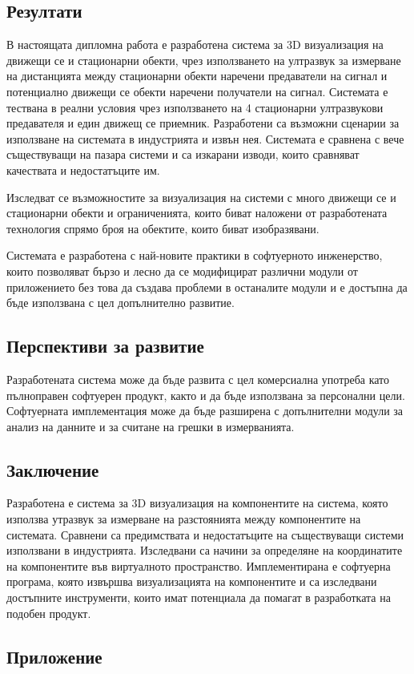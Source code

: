\subsection{Резултати}

В настоящата дипломна работа е разработена система за 3D визуализация на движещи се и стационарни обекти, чрез използването на ултразвук за измерване на дистанцията между стационарни обекти наречени предаватели на сигнал и потенциално движещи се обекти наречени получатели на сигнал. Системата е тествана в реални условия чрез използването на 4 стационарни ултразвукови предавателя и един движещ се приемник. Разработени са възможни сценарии за използване на системата в индустрията и извън нея. Системата е сравнена с вече съществуващи на пазара системи и са изкарани изводи, които сравняват качествата и недостатъците им.

Изследват се възможностите за визуализация на системи с много движещи се и стационарни обекти и ограниченията, които биват наложени от разработената технология спрямо броя на обектите, които биват изобразявани.

Системата е разработена с най-новите практики в софтуерното инженерство, които позволяват бързо и лесно да се модифицират различни модули от приложението без това да създава проблеми в останалите модули и е достъпна да бъде използвана с цел допълнително развитие.

\subsection{Перспективи за развитие}
Разработената система може да бъде развита с цел комерсиална употреба като пълноправен софтуерен продукт, както и да бъде използвана за персонални цели. Софтуерната имплементация може да бъде разширена с допълнителни модули за анализ на данните и за считане на грешки в измерванията.

\subsection{Заключение}
Разработена е система за 3D визуализация на компонентите на система, която използва утразвук за измерване на разстоянията между компонентите на системата. Сравнени са предимствата и недостатъците на съществуващи системи използвани в индустрията. Изследвани са начини за определяне на координатите на компонентите във виртуалното пространство. Имплементирана е софтуерна програма, която извършва визуализацията на компонентите и са изследвани достъпните инструменти, които имат потенциала да помагат в разработката на подобен продукт.

\subsection{Приложение}
